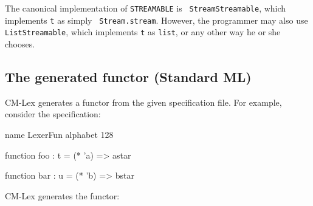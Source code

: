 \documentclass[10pt]{article}
\begin{document}
The canonical implementation of {\tt STREAMABLE} is {\tt
StreamStreamable}, which implements {\tt t} as simply {\tt
Stream.stream}.  However, the programmer may also use {\tt
ListStreamable}, which implements {\tt t} as {\tt list}, or any other
way he or she chooses.


\subsection{The generated functor (Standard ML)}
\label{sec:lex-functor-sml}

CM-Lex generates a functor from the given specification file.  For example,
consider the specification:

\begin{code}
name LexerFun
alphabet 128

function foo : t =
  (* 'a) => astar

function bar : u =
  (* 'b) => bstar
\end{code}


CM-Lex generates the functor:
\end{document}
